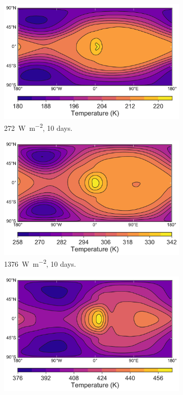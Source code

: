 \begin{figure}
  \centering
  \begin{subfigure}[b]{0.32\textwidth}
    \includegraphics[width=\textwidth]{figures/wave-mean-flow/ar_lowT_10day.pdf}
    \caption{\SI{272}{\watt\per\metre\squared}, 10 days.}
    \label{fig:spherical-low-omega}
  \end{subfigure}
  \begin{subfigure}[b]{0.32\textwidth}
    \includegraphics[width=\textwidth]{figures/wave-mean-flow/ar_mediumT_10day.pdf}
    \caption{\SI{1376}{\watt\per\metre\squared}, 10 days.}
    \label{fig:spherical-low-omega}
  \end{subfigure}
  \begin{subfigure}[b]{0.32\textwidth}
    \includegraphics[width=\textwidth]{figures/wave-mean-flow/ar_highT_10day.pdf}

\end{subfigure}
\end{figure}
